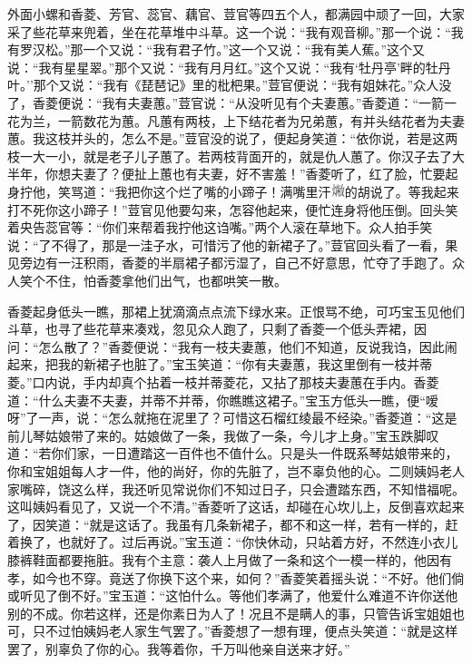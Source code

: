 外面小螺和香菱、芳官、蕊官、藕官、荳官等四五个人，都满园中顽了一回，大家采了些花草来兜着，坐在花草堆中斗草。这一个说：``我有观音柳。''那一个说：``我有罗汉松。''那一个又说：``我有君子竹。''这一个又说：``我有美人蕉。''这个又说：``我有星星翠。''那个又说：``我有月月红。''这个又说：``我有`牡丹亭'畔的牡丹叶。''那个又说：``我有《琵琶记》里的枇杷果。''荳官便说：``我有姐妹花。''众人没了，香菱便说：``我有夫妻蕙。''荳官说：``从没听见有个夫妻蕙。''香菱道：``一箭一花为兰，一箭数花为蕙。凡蕙有两枝，上下结花者为兄弟蕙，有并头结花者为夫妻蕙。我这枝并头的，怎么不是。''荳官没的说了，便起身笑道：``依你说，若是这两枝一大一小，就是老子儿子蕙了。若两枝背面开的，就是仇人蕙了。你汉子去了大半年，你想夫妻了？便扯上蕙也有夫妻，好不害羞！''香菱听了，红了脸，忙要起身拧他，笑骂道：``我把你这个烂了嘴的小蹄子！满嘴里汗\includegraphics[width=4mm]{../images/00028}的胡说了。等我起来打不死你这小蹄子！''荳官见他要勾来，怎容他起来，便忙连身将他压倒。回头笑着央告蕊官等：``你们来帮着我拧他这诌嘴。''两个人滚在草地下。众人拍手笑说：``了不得了，那是一洼子水，可惜污了他的新裙子了。''荳官回头看了一看，果见旁边有一汪积雨，香菱的半扇裙子都污湿了，自己不好意思，忙夺了手跑了。众人笑个不住，怕香菱拿他们出气，也都哄笑一散。

香菱起身低头一瞧，那裙上犹滴滴点点流下绿水来。正恨骂不绝，可巧宝玉见他们斗草，也寻了些花草来凑戏，忽见众人跑了，只剩了香菱一个低头弄裙，因问：``怎么散了？''香菱便说：``我有一枝夫妻蕙，他们不知道，反说我诌，因此闹起来，把我的新裙子也脏了。''宝玉笑道：``你有夫妻蕙，我这里倒有一枝并蒂菱。''口内说，手内却真个拈着一枝并蒂菱花，又拈了那枝夫妻蕙在手内。香菱道：``什么夫妻不夫妻，并蒂不并蒂，你瞧瞧这裙子。''宝玉方低头一瞧，便``嗳呀''了一声，说：``怎么就拖在泥里了？可惜这石榴红绫最不经染。''香菱道：``这是前儿琴姑娘带了来的。姑娘做了一条，我做了一条，今儿才上身。''宝玉跌脚叹道：``若你们家，一日遭踏这一百件也不值什么。只是头一件既系琴姑娘带来的，你和宝姐姐每人才一件，他的尚好，你的先脏了，岂不辜负他的心。二则姨妈老人家嘴碎，饶这么样，我还听见常说你们不知过日子，只会遭踏东西，不知惜福呢。这叫姨妈看见了，又说一个不清。''香菱听了这话，却碰在心坎儿上，反倒喜欢起来了，因笑道：``就是这话了。我虽有几条新裙子，都不和这一样，若有一样的，赶着换了，也就好了。过后再说。''宝玉道：``你快休动，只站着方好，不然连小衣儿膝裤鞋面都要拖脏。我有个主意：袭人上月做了一条和这个一模一样的，他因有孝，如今也不穿。竟送了你换下这个来，如何？''香菱笑着摇头说：``不好。他们倘或听见了倒不好。''宝玉道：``这怕什么。等他们孝满了，他爱什么难道不许你送他别的不成。你若这样，还是你素日为人了！况且不是瞒人的事，只管告诉宝姐姐也可，只不过怕姨妈老人家生气罢了。''香菱想了一想有理，便点头笑道：``就是这样罢了，别辜负了你的心。我等着你，千万叫他亲自送来才好。''

